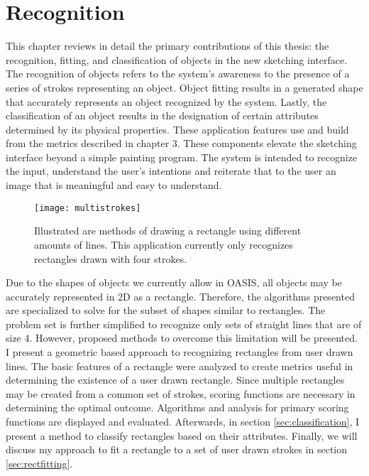 \chapter{Recognition} \label{sec:recognition}
This chapter reviews in detail the primary contributions of this thesis: the recognition, fitting, and classification of objects in the new sketching interface. The recognition of objects refers to the system's awareness to the presence of a series of strokes representing an object. Object fitting results in a generated shape that accurately represents an object recognized by the system. Lastly, the classification of an object results in the designation of certain attributes determined by its physical properties. These application features use and build from the metrics described in chapter 3.  These components elevate the sketching interface beyond a simple painting program. The system is intended to recognize the input, understand the user's intentions and reiterate that to the user an image that is meaningful and easy to understand. \\

\begin{figure}[ht]
\centering
\texttt{[image: multistrokes]}
\caption[Comparisons between methods of drawing a rectangle using different amounts of lines.]{Illustrated are methods of drawing a rectangle using different amounts of lines. This application currently only recognizes rectangles drawn with four strokes.}
\label{fig:multistrokes}
\end{figure}

Due to the shapes of objects we currently allow in OASIS, all objects may be accurately represented in 2D as a rectangle. Therefore, the algorithms presented are specialized to solve for the subset of shapes similar to rectangles. The problem set is further simplified to recognize only sets of straight lines that are of size 4. However, proposed methods to overcome this limitation will be presented. \\

I present a geometric based approach to recognizing rectangles from user drawn lines. The basic features of a rectangle were analyzed to create metrics useful in determining the existence of a user drawn rectangle. Since multiple rectangles may be created from a common set of strokes, scoring functions are necessary in determining the optimal outcome. Algorithms and analysis for primary scoring functions are displayed and evaluated. Afterwards, in section \ref{sec:classification}, I present a method to classify rectangles based on their attributes. Finally, we will discuss my approach to fit a rectangle to a set of user drawn strokes in section \ref{sec:rectfitting}. \\

